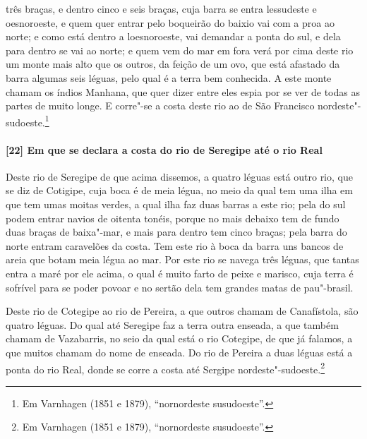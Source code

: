 \begin{linenumbers}
três braças, e dentro cinco e seis braças, cuja barra se entra lessudeste e oesnoroeste, e
quem quer entrar pelo boqueirão do baixio vai com a proa ao norte; e como está dentro a
loesnoroeste, vai demandar a ponta do sul, e dela para dentro se vai ao norte; e quem vem
do mar em fora verá por cima deste rio um monte mais alto que os outros, da feição de um
ovo, que está afastado da barra algumas seis léguas, pelo qual é a terra bem conhecida. A
este monte chamam os índios Manhana, que quer dizer entre eles espia por se ver de todas
as partes de muito longe. E corre"-se a costa deste rio ao de São Francisco
nordeste"-sudoeste.\footnote{ Em Varnhagen (1851 e 1879), ``nornordeste susudoeste''.}

\paragraph{[22] Em que se declara a costa do rio de Seregipe até o rio Real} \quad
Deste rio de Seregipe de que acima dissemos, a quatro léguas está outro rio, que se diz de
Cotigipe, cuja boca é de meia légua, no meio da qual tem uma ilha em que tem umas moitas
verdes, a qual ilha faz duas barras a este rio; pela do sul podem entrar navios de oitenta
tonéis, porque no mais debaixo tem de fundo duas braças de baixa"-mar, e mais para dentro
tem cinco braças; pela barra do norte entram caravelões da costa. Tem este rio à boca da
barra uns bancos de areia que botam meia légua ao mar. Por este rio se navega três léguas,
que tantas entra a maré por ele acima, o qual é muito farto de peixe e marisco, cuja terra
é sofrível para se poder povoar e no sertão dela tem grandes matas de pau"-brasil.

Deste rio de Cotegipe ao rio de Pereira, a que outros chamam de Canafístola, são quatro
léguas. Do qual até Seregipe faz a terra outra enseada, a que também chamam de Vazabarris,
no seio da qual está o rio Cotegipe, de que já falamos, a que muitos chamam do nome de
enseada. Do rio de Pereira a duas léguas está a ponta do rio Real, donde se corre a costa
até Sergipe nordeste"-sudoeste.\footnote{ Em Varnhagen (1851 e 1879), ``nornordeste
susudoeste''.}


\end{linenumbers}
